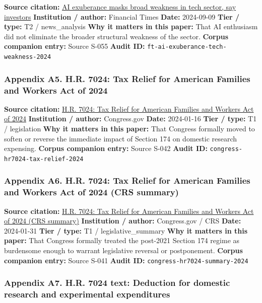\documentclass[
  american,
  11pt,
  letterpaper,
]{article}
\begin{document}
\textbf{Source citation:}
\href{https://www.ft.com/content/0b14d871-2d19-46f1-9660-5466301e8066}{AI
exuberance masks broad weakness in tech sector, say investors}
\textbf{Institution / author:} Financial Times \textbf{Date:} 2024-09-09
\textbf{Tier / type:} T2 / news\_analysis \textbf{Why it matters in this
paper:} That AI enthusiasm did not eliminate the broader structural
weakness of the sector. \textbf{Corpus companion entry:} Source S-055
\textbf{Audit ID:} \texttt{ft-ai-exuberance-tech-weakness-2024}

\subsubsection{Appendix A5. H.R. 7024: Tax Relief for American Families
and Workers Act of
2024}\label{appendix-a5-h-r-7024-tax-relief-for-american-families-and-workers-act-of-2024}

\textbf{Source citation:}
\href{https://www.congress.gov/bill/118th-congress/house-bill/7024}{H.R.
7024: Tax Relief for American Families and Workers Act of 2024}
\textbf{Institution / author:} Congress.gov \textbf{Date:} 2024-01-16
\textbf{Tier / type:} T1 / legislation \textbf{Why it matters in this
paper:} That Congress formally moved to soften or reverse the immediate
impact of Section 174 on domestic research expensing. \textbf{Corpus
companion entry:} Source S-042 \textbf{Audit ID:}
\texttt{congress-hr7024-tax-relief-2024}

\subsubsection{Appendix A6. H.R. 7024: Tax Relief for American Families
and Workers Act of 2024 (CRS
summary)}\label{appendix-a6-h-r-7024-tax-relief-for-american-families-and-workers-act-of-2024-crs-summary}

\textbf{Source citation:}
\href{https://www.congress.gov/bill/118th-congress/house-bill/7024}{H.R.
7024: Tax Relief for American Families and Workers Act of 2024 (CRS
summary)} \textbf{Institution / author:} Congress.gov / CRS
\textbf{Date:} 2024-01-31 \textbf{Tier / type:} T1 /
legislative\_summary \textbf{Why it matters in this paper:} That
Congress formally treated the post-2021 Section 174 regime as burdensome
enough to warrant legislative reversal or postponement. \textbf{Corpus
companion entry:} Source S-041 \textbf{Audit ID:}
\texttt{congress-hr7024-summary-2024}

\subsubsection{Appendix A7. H.R. 7024 text: Deduction for domestic
research and experimental
expenditures}\label{appendix-a7-h-r-7024-text-deduction-for-domestic-research-and-experimental-expenditures}
\end{document}
